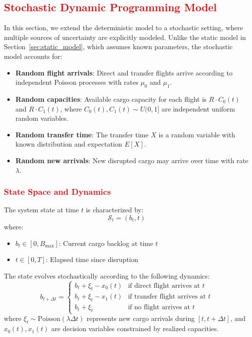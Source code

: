 \documentclass[opre,sglanonrev]{informs4}
\begin{document}
\subsection{\textcolor{red}{Stochastic Dynamic Programming Model}}
\label{sec:stochastic_model}

{\color{brown}
In this section, we extend the deterministic model to a stochastic setting, where multiple sources of uncertainty are explicitly modeled. Unlike the static model in Section~\ref{sec:static_model}, which assumes known parameters, the stochastic model accounts for:
\begin{itemize}
    \item \textbf{Random flight arrivals}: Direct and transfer flights arrive according to independent Poisson processes with rates \( \mu_0 \) and \( \mu_1 \).
    \item \textbf{Random capacities}: Available cargo capacity for each flight is \( R \cdot C_0(t) \) and \( R \cdot C_1(t) \), where \( C_0(t), C_1(t) \sim U(0,1] \) are independent uniform random variables.
    \item \textbf{Random transfer time}: The transfer time \( X \) is a random variable with known distribution and expectation \( E[X] \).
    \item \textbf{Random new arrivals}: New disrupted cargo may arrive over time with rate \( \lambda \).
\end{itemize}
}

\subsubsection{\textcolor{red}{State Space and Dynamics}}

{\color{brown}
The system state at time \( t \) is characterized by:
\[
\mathcal{S}_t = (b_t, t)
\]
where:
\begin{itemize}
    \item \( b_t \in [0, B_{\max}] \): Current cargo backlog at time \( t \)
    \item \( t \in [0, T] \): Elapsed time since disruption
\end{itemize}

The state evolves stochastically according to the following dynamics:
\[
b_{t+\Delta t} = \begin{cases}
b_t + \xi_t - x_0(t) & \text{if direct flight arrives at } t \\
b_t + \xi_t - x_1(t) & \text{if transfer flight arrives at } t \\
b_t + \xi_t & \text{if no flight arrives at } t
\end{cases}
\]
where \( \xi_t \sim \text{Poisson}(\lambda \Delta t) \) represents new cargo arrivals during \( [t, t+\Delta t] \), and \( x_0(t), x_1(t) \) are decision variables constrained by realized capacities.
}
\end{document}
